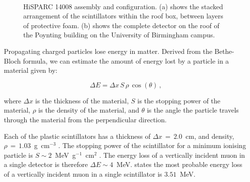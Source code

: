 \begin{figure}[ht!]
	\centering
	 \\
	
	\caption{HiSPARC 14008 assembly and configuration. (a) shows the stacked arrangement of the scintillators within the roof box, between layers of protective foam. (b) shows the complete detector on the roof of the Poynting building on the University of Birmingham campus.}
	\label{fig:HS_14008_setup}
\end{figure}


Propagating charged particles lose energy in matter. Derived from the Bethe-Bloch formula, we can estimate the amount of energy lost by a particle in a material given by:

\begin{equation}
\Delta E = \Delta x \, S \, \rho \, \cos(\theta) \, ,
\label{eq:energy_loss}
\end{equation}

where $\Delta x$ is the thickness of the material, $S$ is the stopping power of the material, $\rho$ is the density of the material, and $\theta$ is the angle the particle travels through the material from the perpendicular direction.

Each of the plastic scintillators has a thickness of $\Delta x \, = \, 2.0$~cm, and density, $\rho \, = \, 1.03$~g~cm$^{-3}$ \citep{montanus_observability_2017}. The stopping power of the scintillator for a minimum ionising particle is $S \sim 2$~MeV~g$^{-1}$~cm$^{2}$ \citep{fokkema_hisparc_2012, montanus_observability_2017}. The energy loss of a vertically incident muon in a single detector is therefore $\Delta E \sim 4$~MeV. \cite{van_dam_hisparc_2020} states the most probable energy loss of a vertically incident muon in a single scintillator is $3.51$~MeV.

